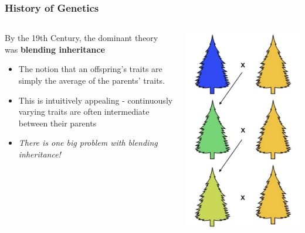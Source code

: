 \documentclass{beamer}
\begin{document}
\begin{frame}
	\frametitle{History of Genetics}
	
	\begin{columns}[T]
		\begin{column}{.6\textwidth}
			By the 19th Century, the dominant theory was \textbf{blending inheritance}
		
			\vspace{5pt}
			\begin{itemize}
				\item The notion that an offspring's traits are simply the average of the parents' traits. 
				\item This is intuitively appealing -  continuously varying traits are often intermediate between their parents 
				\item \textit{There is one big problem with blending inheritance!}
			\end{itemize}
		\end{column}
		\begin{column}{.3\textwidth}
				\centering
			\includegraphics[keepaspectratio, width  = \textwidth]{img/blending}
		\end{column}
	\end{columns}
	

\end{frame}
\end{document}

